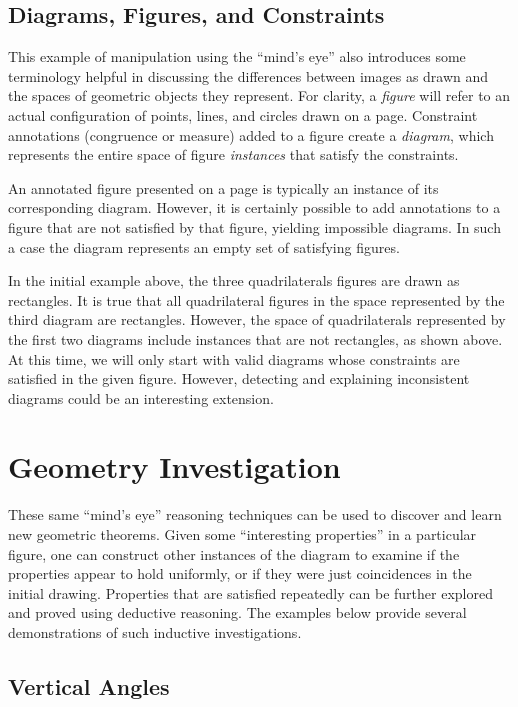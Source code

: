 \documentclass[10pt]{article}
\begin{document}
\onehalfspacing

\subsection{Diagrams, Figures, and Constraints}

This example of manipulation using the ``mind's eye'' also introduces
some terminology helpful in discussing the differences between images
as drawn and the spaces of geometric objects they represent.  For
clarity, a \emph{figure} will refer to an actual configuration of
points, lines, and circles drawn on a page.  Constraint annotations
(congruence or measure) added to a figure create a \emph{diagram},
which represents the entire space of figure \emph{instances} that
satisfy the constraints.

An annotated figure presented on a page is typically an instance of
its corresponding diagram.  However, it is certainly possible to add
annotations to a figure that are not satisfied by that figure,
yielding impossible diagrams.  In such a case the diagram represents
an empty set of satisfying figures.

In the initial example above, the three quadrilaterals figures are
drawn as rectangles.  It is true that all quadrilateral figures in the
space represented by the third diagram are rectangles.  However, the
space of quadrilaterals represented by the first two diagrams include
instances that are not rectangles, as shown above.  At this time, we
will only start with valid diagrams whose constraints are satisfied in
the given figure.  However, detecting and explaining inconsistent
diagrams could be an interesting extension.

\section{Geometry Investigation}

These same ``mind's eye'' reasoning techniques can be used to discover
and learn new geometric theorems.  Given some ``interesting
properties'' in a particular figure, one can construct other instances
of the diagram to examine if the properties appear to hold uniformly,
or if they were just coincidences in the initial drawing.  Properties
that are satisfied repeatedly can be further explored and proved using
deductive reasoning.  The examples below provide several
demonstrations of such inductive investigations.

\subsection{Vertical Angles}
\end{document}
